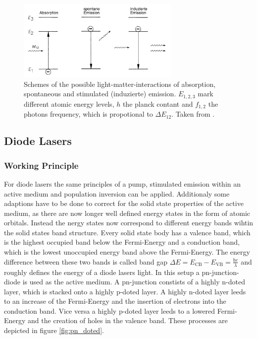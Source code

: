         \begin{figure}[h]
            \centering
            \includegraphics[width = 0.7\textwidth]{pictures/prozesse.jpg}
            \caption{Schemes of the possible light-matter-interactions of absorption, spontaneous and stimulated (induzierte) emission. $E_{1,2,3}$ mark different atomic energy levels, $h$ the planck contant and $f_{1,2}$ the photons frequency, which is propotional to $\Delta E_{12}$. Taken from \cite{eichler_laser_2015}.}
            \label{fig:prozesse}
        \end{figure}
        
        \FloatBarrier


    \subsection{Diode Lasers}
        \subsubsection{Working Principle}
            For diode lasers the same principles of a pump, stimulated emission within an active medium and population inversion can be applied. Additionaly some adaptions have to be done to correct for the solid 
            state properties of the active medium, as there are now longer well defined energy states in the form of atomic orbitals. Instead the nergy states now correspond to different energy bands wihtin the solid 
            states band structure. 
            Every solid state body has a valence band, which is the highest occupied band below the Fermi-Energy and a conduction band, which is the lowest unoccupied energy band above the Fermi-Energy. The energy
            difference between these two bands is called band gap $\Delta E = E_{\text{CB}} - E_{\text{VB}} = \frac{\text{hc}}{\lambda}$ and roughly defines the energy of a diode lasers light. 
            In this setup a pn-junction-diode is used as the active medium. A pn-junction constists of a highly n-doted layer, which is stacked onto a highly p-doted layer. A highly n-doted layer leeds to an 
            increase of the Fermi-Energy and the insertion of electrons into the conduction band. Vice versa a highly p-doted layer leeds to a lowered Fermi-Energy and the creation of holes in the valence band. 
            These processes are depicted in figure \ref{fig:pn_doted}.  

